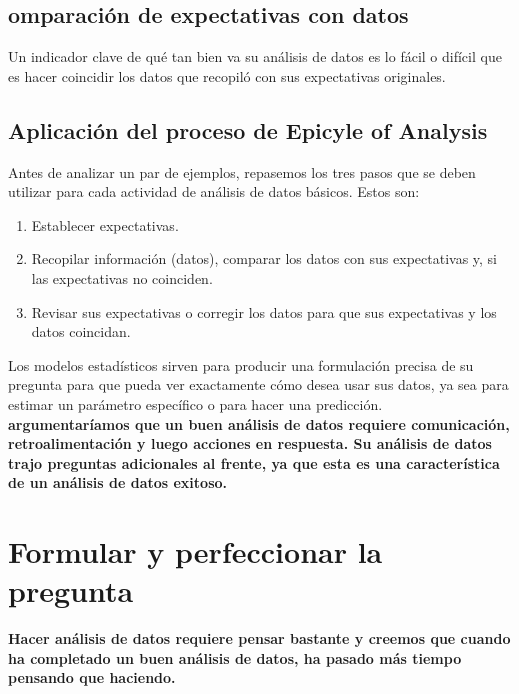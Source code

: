 \documentclass[10pt]{book}
\begin{document}
\section{omparación de expectativas con datos}
Un indicador clave de qué tan bien va su análisis de datos es lo fácil o difícil que es hacer coincidir los datos que recopiló con sus expectativas originales.

\section{Aplicación del proceso de Epicyle of Analysis}
Antes de analizar un par de ejemplos, repasemos los tres pasos que se deben utilizar para cada actividad de análisis de datos básicos. Estos son: 
\begin{enumerate}[\bfseries 1.]
\item Establecer expectativas.
\item Recopilar información (datos), comparar los datos con sus expectativas y, si las expectativas no coinciden.
\item Revisar sus expectativas o corregir los datos para que sus expectativas y los datos coincidan.
\end{enumerate}
Los modelos estadísticos sirven para producir una formulación precisa de su pregunta para que pueda ver exactamente cómo desea usar sus datos, ya sea para estimar un parámetro específico o para hacer una predicción.\\
\textbf{argumentaríamos que un buen análisis de datos requiere comunicación, retroalimentación y luego acciones en respuesta. Su análisis de datos trajo preguntas adicionales al frente, ya que esta es una característica de un análisis de datos exitoso.}

\chapter{Formular y perfeccionar la pregunta}
\textbf{Hacer análisis de datos requiere pensar bastante y creemos que cuando ha completado un buen análisis de datos, ha pasado más tiempo pensando que haciendo.}
\end{document}
